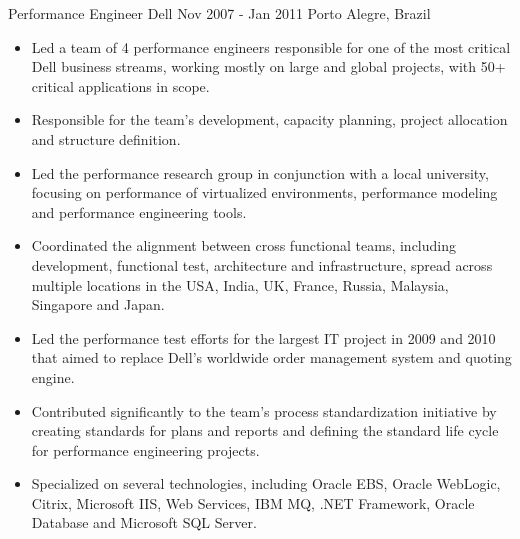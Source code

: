 \documentclass[]{mspier-cv}
\begin{document}
\experienceitem
  {Performance Engineer}
  {Dell}
  {Nov 2007 - Jan 2011}
  {Porto Alegre, Brazil}
  {
  \begin{itemize}
    \item Led a team of 4 performance engineers responsible for one of the most critical Dell business streams, working mostly on large and global projects, with 50+ critical applications in scope.
    \item Responsible for the team’s development, capacity planning, project allocation and structure definition.
    \item Led the performance research group in conjunction with a local university, focusing on performance of virtualized environments, performance modeling and performance engineering tools.
    \item Coordinated the alignment between cross functional teams, including development, functional test, architecture and infrastructure, spread across multiple locations  in the USA, India, UK, France, Russia, Malaysia, Singapore and Japan.
    \item Led the performance test efforts for the largest IT project in 2009 and 2010 that aimed to replace Dell’s worldwide order management system and quoting engine.
    \item Contributed significantly to the team’s process standardization initiative by creating standards for plans and reports and defining the standard life cycle for performance engineering projects.
    \item Specialized on several technologies, including Oracle EBS, Oracle WebLogic, Citrix, Microsoft IIS, Web Services, IBM MQ, .NET Framework, Oracle Database and Microsoft SQL Server.
  \end{itemize}
  }
\end{document}
